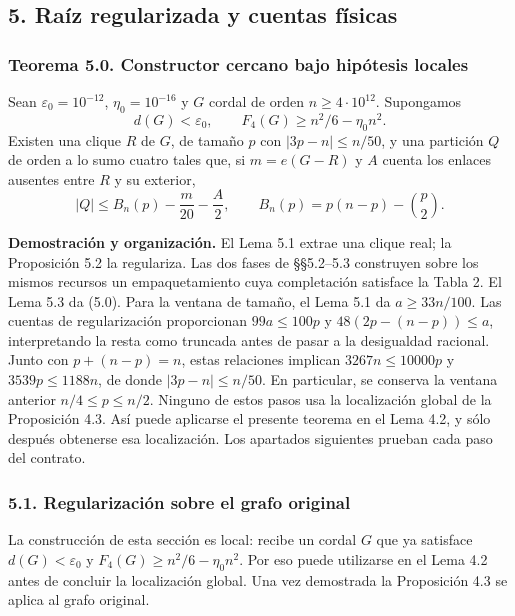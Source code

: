 \documentclass[spanish,11pt,a4paper]{article}
\begin{document}
\subsection{5. Raíz regularizada y cuentas físicas}\label{raiz-regularizada-y-cuentas-fisicas}

\subsubsection{Teorema 5.0. Constructor cercano bajo hipótesis locales}\label{teorema-5.0.-constructor-cercano-bajo-hipotesis-locales}

Sean \(\varepsilon_0=10^{-12}\), \(\eta_0=10^{-16}\) y \(G\) cordal de orden \(n\ge4\cdot10^{12}\). Supongamos \[
d(G)<\varepsilon_0,\qquad F_4(G)\ge n^2/6-\eta_0n^2.
\] Existen una clique \(R\) de \(G\), de tamaño \(p\) con \(|3p-n|\le n/50\), y una partición \(Q\) de orden a lo sumo cuatro tales que, si \(m=e(G-R)\) y \(A\) cuenta los enlaces ausentes entre \(R\) y su exterior, \[
|Q|\le B_n(p)-\frac m{20}-\frac A2,\qquad
B_n(p)=p(n-p)-\binom p2.
\tag{5.0}
\]

\textbf{Demostración y organización.} El Lema 5.1 extrae una clique real; la Proposición 5.2 la regulariza. Las dos fases de §§5.2--5.3 construyen sobre los mismos recursos un empaquetamiento cuya completación satisface la Tabla 2. El Lema 5.3 da (5.0). Para la ventana de tamaño, el Lema 5.1 da \(a\ge33n/100\). Las cuentas de regularización proporcionan \(99a\le100p\) y \(48(2p-(n-p))\le a\), interpretando la resta como truncada antes de pasar a la desigualdad racional. Junto con \(p+(n-p)=n\), estas relaciones implican \(3267n\le10000p\) y \(3539p\le1188n\), de donde \(|3p-n|\le n/50\). En particular, se conserva la ventana anterior \(n/4\le p\le n/2\). Ninguno de estos pasos usa la localización global de la Proposición 4.3. Así puede aplicarse el presente teorema en el Lema 4.2, y sólo después obtenerse esa localización. Los apartados siguientes prueban cada paso del contrato.

\subsubsection{5.1. Regularización sobre el grafo original}\label{regularizacion-sobre-el-grafo-original}

La construcción de esta sección es local: recibe un cordal \(G\) que ya satisface \(d(G)<\varepsilon_0\) y \(F_4(G)\ge n^2/6-\eta_0n^2\). Por eso puede utilizarse en el Lema 4.2 antes de concluir la localización global. Una vez demostrada la Proposición 4.3 se aplica al grafo original.
\end{document}
